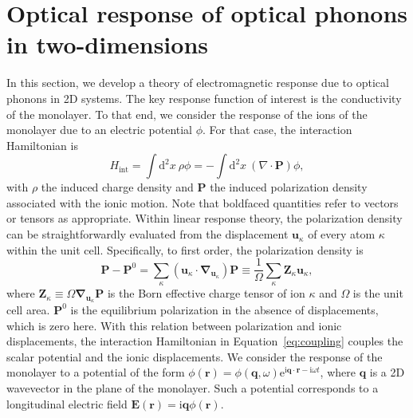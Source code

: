 \documentclass[aps,prb,twocolumn,
	           groupedaddress,superscriptaddress,
               amsfonts,amssymb,amsmath,floatfix,
	           citeautoscript]{revtex4-1}
\newcommand{\iu}{\mathrm{i}}
\newcommand{\e}{\mathrm{e}}
\newcommand{\dd}{\mathrm{d}}
\begin{document}
\section{Optical response of optical phonons in two-dimensions}
In this section, we develop a theory of electromagnetic response due to optical phonons in 2D systems. The key response function of interest is the conductivity of the monolayer. To that end, we consider the response of the ions of the monolayer due to an electric potential $\phi$. For that case, the interaction Hamiltonian is
\begin{equation}
    H_{\mathrm{int}} = \int \dd^2x ~\rho \phi = -\int \dd^2x~ (\nabla\cdot\mathbf{P})\phi,
    \label{eq:coupling}
\end{equation} 
with $\rho$ the induced charge density and $\mathbf{P}$ the induced polarization density associated with the ionic motion. Note that boldfaced quantities refer to vectors or tensors as appropriate. Within linear response theory, the polarization density can be straightforwardly evaluated from the displacement  $\mathbf{u}_{\kappa}$ of every atom $\kappa$ within the unit cell. Specifically, to first order, the polarization density is 
\begin{equation}
\mathbf{P} - \mathbf{P}^0 = \sum_\kappa(\mathbf{u}_\kappa\cdot\boldsymbol{\nabla}_{\mathbf{u}_\kappa})\mathbf{P} \equiv \frac{1}{\Omega}\sum_\kappa\mathbf{Z}_{\kappa}\mathbf{u}_{\kappa},
\end{equation} 
where $\mathbf{Z}_\kappa \equiv \Omega\boldsymbol{\nabla}_{\mathbf{u}_\kappa}\mathbf{P}$ is the Born effective charge tensor of ion $\kappa$ and $\Omega$ is the unit cell area. $\mathbf{P}^0$ is the equilibrium polarization in the absence of displacements, which is zero here. With this relation between polarization and ionic displacements, the interaction Hamiltonian in Equation~\eqref{eq:coupling} couples the scalar potential and the ionic displacements.  We consider the response of the monolayer to a potential of the form $\phi(\mathbf{r}) = \phi(\mathbf{q},\omega)\e^{\iu\mathbf{q}\cdot\mathbf{r}-\iu\omega t}$, where $\mathbf{q}$ is a 2D wavevector in the plane of the monolayer. Such a potential corresponds to a longitudinal electric field  $\mathbf{E}(\mathbf{r}) = \iu\mathbf{q}\phi(\mathbf{r})$. 
\end{document}
